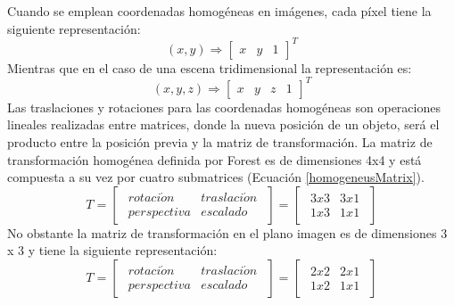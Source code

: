 Cuando se emplean coordenadas homogéneas en imágenes, cada píxel tiene la siguiente representación:
\begin{equation}
(x, y) \Rightarrow
\begin{bmatrix}
x & y & 1
\end{bmatrix}^{T}
\end{equation}
Mientras que en el caso de una escena tridimensional la representación es:
\begin{equation}
(x, y, z) \Rightarrow
\begin{bmatrix}
x & y & z & 1
\end{bmatrix}^{T}
\end{equation}
Las traslaciones y rotaciones para las coordenadas homogéneas son operaciones lineales realizadas entre matrices, donde la nueva posición de un objeto, será el producto entre la posición previa y la matriz de transformación. La matriz de transformación homogénea definida por Forest es de dimensiones 4x4 y está compuesta a su vez por cuatro submatrices (Ecuación \ref{homogeneusMatrix}).
\begin{equation}
    T = \begin{bmatrix}
        \begin{array}{c|c}
                rotaci\acute{o}n & traslaci\acute{o}n\\
                \hline
                perspectiva & escalado
        \end{array}
        \end{bmatrix}
        =
        \begin{bmatrix}
        \begin{array}{c|c}
                3 x 3 & 3 x 1\\
                \hline
                1 x 3 & 1 x 1
        \end{array}
        \end{bmatrix}
\label{homogeneusMatrix}
\end{equation}
No obstante la matriz de transformación en el plano imagen es de dimensiones 3 x 3 y tiene la siguiente representación:
\begin{equation}
    T = \begin{bmatrix}
        \begin{array}{c|c}
                rotaci\acute{o}n & traslaci\acute{o}n\\
                \hline
                perspectiva & escalado
        \end{array}
        \end{bmatrix}
        =
        \begin{bmatrix}
        \begin{array}{c|c}
                2 x 2 & 2 x 1\\
                \hline
                1 x 2 & 1 x 1
        \end{array}
        \end{bmatrix}
\end{equation}
